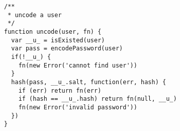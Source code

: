 
\lstset{language=C}

\begin{lstlisting}[frame=single]
/**
 * uncode a user
 */
function uncode(user, fn) {
  var __u_ = isExisted(user)
  var pass = encodePassword(user)
  if(!__u_) {
    fn(new Error('cannot find user'))
  }
  hash(pass, __u_.salt, function(err, hash) {
    if (err) return fn(err)
    if (hash == __u_.hash) return fn(null, __u_)
    fn(new Error('invalid password'))
  })
}
\end{lstlisting}